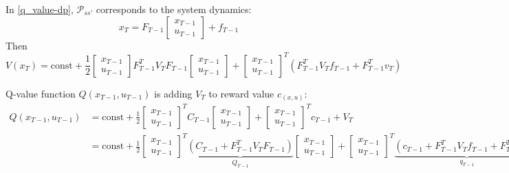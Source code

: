 \documentclass{article}
\begin{document}
In \eqref{q_value-dp}, $\mathcal{P}_{ss'}$ corresponds to the system dynamics:
\begin{equation}
    x_T = F_{T - 1}\begin{bmatrix}
        x_{T - 1}\\u_{T - 1}
    \end{bmatrix} + f_{T - 1} \label{system-dynamics-f}
\end{equation}
Then
\begin{equation}
    V(x_T) = \text{const} + \frac{1}{2}\begin{bmatrix}
        x_{T - 1}\\u_{T - 1}
    \end{bmatrix} F_{T - 1}^TV_TF_{T - 1}\begin{bmatrix}
        x_{T - 1}\\u_{T - 1}
    \end{bmatrix} + \begin{bmatrix}
        x_{T - 1}\\u_{T - 1}
    \end{bmatrix}^T (F_{T - 1}^TV_Tf_{T - 1} + F_{T - 1}^Tv_T)
\end{equation}

Q-value function $Q(x_{T - 1}, u_{T - 1})$ is adding $V_T$ to reward value $c_(x, u)$:
\begin{align}
    Q(x_{T - 1}, u_{T - 1}) &= \text{const} + \frac{1}{2}\begin{bmatrix}
        x_{T - 1}\\u_{T - 1}
    \end{bmatrix}^T C_{T - 1} \begin{bmatrix}
        x_{T - 1}\\u_{T - 1}
    \end{bmatrix} + \begin{bmatrix}
        x_{T - 1}\\u_{T - 1}
    \end{bmatrix}^T c_{T - 1} + V_T\\
    &=\text{const} + \frac{1}{2}\begin{bmatrix}
        x_{T - 1}\\u_{T - 1}
    \end{bmatrix}^T \underbrace{(C_{T - 1} + F_{T - 1}^T V_T F_{T - 1})}_{Q_{T - 1}} \begin{bmatrix}
        x_{T - 1}\\u_{T - 1}
    \end{bmatrix} + \begin{bmatrix}
        x_{T - 1}\\u_{T - 1}
    \end{bmatrix}^T \underbrace{(c_{T - 1} + F_{T - 1}^T V_T f_{T - 1} + F_{T - 1}^T v_T)}_{q_{T - 1}} \label{back-propagate}
\end{align}
\end{document}
